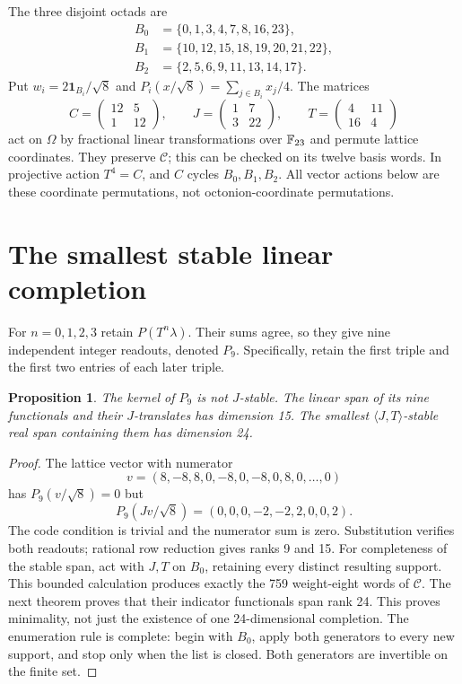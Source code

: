 \documentclass[10pt,reqno]{amsart}
\newtheorem{proposition}[theorem]{Proposition}
\theoremstyle{remark}\newtheorem{remark}[theorem]{Remark}
\newcommand{\one}{\mathbf1}\newcommand{\Span}{\operatorname{span}}
\begin{document}
The three disjoint octads are
\begin{align*}
B_0&=\{0,1,3,4,7,8,16,23\},\\
B_1&=\{10,12,15,18,19,20,21,22\},\\
B_2&=\{2,5,6,9,11,13,14,17\}.
\end{align*}
Put $w_i=2\one_{B_i}/\sqrt8$ and $P_i(x/\sqrt8)=\sum_{j\in B_i}x_j/4$. The matrices
\[
C=\begin{pmatrix}12&5\\1&12\end{pmatrix},\qquad
J=\begin{pmatrix}1&7\\3&22\end{pmatrix},\qquad
T=\begin{pmatrix}4&11\\16&4\end{pmatrix}
\]
act on $\Omega$ by fractional linear transformations over $\mathbb F_{23}$ and permute lattice coordinates. They preserve $\mathcal C$; this can be checked on its twelve basis words. In projective action $T^4=C$, and $C$ cycles $B_0,B_1,B_2$. All vector actions below are these coordinate permutations, not octonion-coordinate permutations.

\section{The smallest stable linear completion}
For $n=0,1,2,3$ retain $P(T^n\lambda)$. Their sums agree, so they give nine independent integer readouts, denoted $P_9$. Specifically, retain the first triple and the first two entries of each later triple.
\begin{proposition}\label{prop:ninefailure}
The kernel of $P_9$ is not $J$-stable. The linear span of its nine functionals and their $J$-translates has dimension 15. The smallest $\langle J,T\rangle$-stable real span containing them has dimension 24.
\end{proposition}
\begin{proof}
The lattice vector with numerator
\[
v=(8,-8,8,0,-8,0,-8,0,8,0,\ldots,0)
\]
has $P_9(v/\sqrt8)=0$ but
\[
P_9(Jv/\sqrt8)=(0,0,0,-2,-2,2,0,0,2).
\]
The code condition is trivial and the numerator sum is zero. Substitution verifies both readouts; rational row reduction gives ranks 9 and 15. For completeness of the stable span, act with $J,T$ on $B_0$, retaining every distinct resulting support. This bounded calculation produces exactly the 759 weight-eight words of $\mathcal C$. The next theorem proves that their indicator functionals span rank 24. This proves minimality, not just the existence of one 24-dimensional completion. The enumeration rule is complete: begin with $B_0$, apply both generators to every new support, and stop only when the list is closed. Both generators are invertible on the finite set.
\end{proof}
\end{document}
